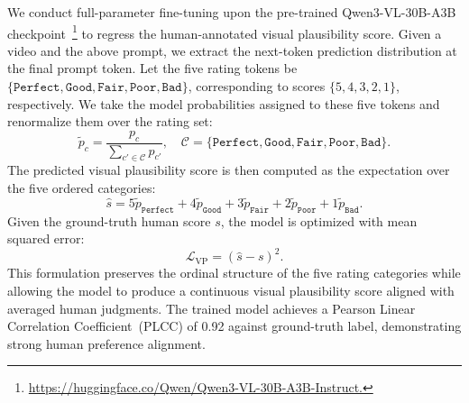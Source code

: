 We conduct full-parameter fine-tuning upon the pre-trained Qwen3-VL-30B-A3B checkpoint~\footnote{\url{https://huggingface.co/Qwen/Qwen3-VL-30B-A3B-Instruct.}} to regress the human-annotated visual plausibility score. Given a video and the above prompt, we extract the next-token prediction distribution at the final prompt token. Let the five rating tokens be
\(\{\texttt{Perfect}, \texttt{Good}, \texttt{Fair}, \texttt{Poor}, \texttt{Bad}\}\),
corresponding to scores \(\{5,4,3,2,1\}\), respectively. We take the model probabilities assigned to these five tokens and renormalize them over the rating set:
\[
\tilde{p}_c =
\frac{p_c}{\sum_{c' \in \mathcal{C}} p_{c'}},
\quad
\mathcal{C}=\{\texttt{Perfect}, \texttt{Good}, \texttt{Fair}, \texttt{Poor}, \texttt{Bad}\}.
\]
The predicted visual plausibility score is then computed as the expectation over the five ordered categories:
\[
\hat{s}
=
5\tilde{p}_{\texttt{Perfect}}
+4\tilde{p}_{\texttt{Good}}
+3\tilde{p}_{\texttt{Fair}}
+2\tilde{p}_{\texttt{Poor}}
+1\tilde{p}_{\texttt{Bad}}.
\]
Given the ground-truth human score \(s\), the model is optimized with mean squared error:
\[
\mathcal{L}_{\mathrm{VP}} = (\hat{s} - s)^2.
\]
This formulation preserves the ordinal structure of the five rating categories while allowing the model to produce a continuous visual plausibility score aligned with averaged human judgments. The trained model achieves a Pearson Linear Correlation Coefficient~(PLCC) of 0.92 against ground-truth label, demonstrating strong human preference alignment.
